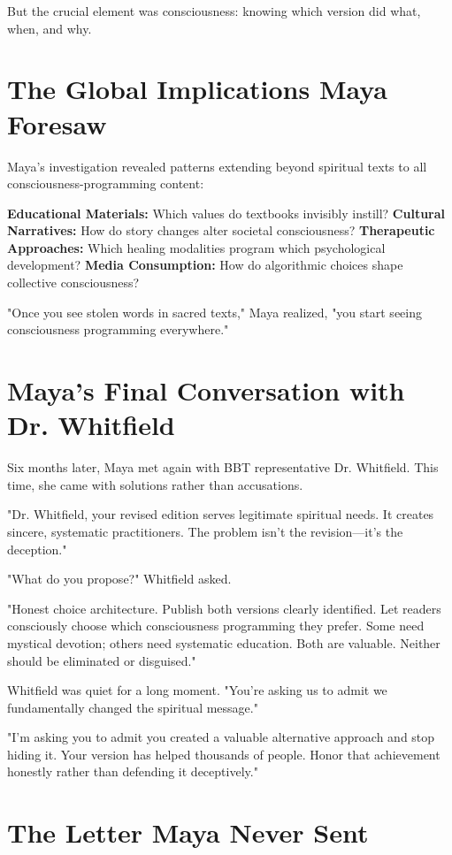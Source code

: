 \documentclass[11pt,twoside]{book}
\begin{document}
But the crucial element was consciousness: knowing which version did what, when, and why.
\section*{The Global Implications Maya Foresaw}
\label{sec:org268ec9f}

Maya's investigation revealed patterns extending beyond spiritual texts to all consciousness-programming content:

\textbf{\textbf{Educational Materials:}} Which values do textbooks invisibly instill?
\textbf{\textbf{Cultural Narratives:}} How do story changes alter societal consciousness?
\textbf{\textbf{Therapeutic Approaches:}} Which healing modalities program which psychological development?
\textbf{\textbf{Media Consumption:}} How do algorithmic choices shape collective consciousness?

"Once you see stolen words in sacred texts," Maya realized, "you start seeing consciousness programming everywhere."
\section*{Maya's Final Conversation with Dr. Whitfield}
\label{sec:orgeb9fc46}

Six months later, Maya met again with BBT representative Dr. Whitfield. This time, she came with solutions rather than accusations.

"Dr. Whitfield, your revised edition serves legitimate spiritual needs. It creates sincere, systematic practitioners. The problem isn't the revision—it's the deception."

"What do you propose?" Whitfield asked.

"Honest choice architecture. Publish both versions clearly identified. Let readers consciously choose which consciousness programming they prefer. Some need mystical devotion; others need systematic education. Both are valuable. Neither should be eliminated or disguised."

Whitfield was quiet for a long moment. "You're asking us to admit we fundamentally changed the spiritual message."

"I'm asking you to admit you created a valuable alternative approach and stop hiding it. Your version has helped thousands of people. Honor that achievement honestly rather than defending it deceptively."
\section*{The Letter Maya Never Sent}
\label{sec:org01dc879}
\end{document}
